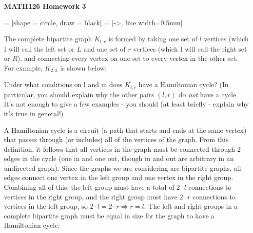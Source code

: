 \documentclass{article}
\begin{document}
\centerline{\large \bf MATH126 Homework 3}

\vskip 0.15in

 = [shape = circle, draw = black]
 = [->, line width=0.5mm]
\begin{problem} The complete bipartite graph $K_{l,r}$ is formed by taking one set of $l$ vertices (which I will call the left set or $L$ and one set of $r$ vertices (which I will call the right set or $R$), and connecting every vertex on one set to every vertex in the other set.  For example, $K_{2,3}$ is shown below:
\vskip 0.15in \noindent
{}
\vskip 0.15in \noindent
Under what conditions on l and m does $K_{l,r}$ have a Hamiltonian cycle? (In particular, you should explain why the other pairs $(l,r)$ do \emph{not} have a cycle. It's not enough to give a few examples - you should (at least briefly - explain why it's true in general!)
\end{problem}

\begin{solution} A Hamiltonian cycle is a circuit (a path that starts and ends at the same vertex) that passes through (or includes) all of the vertices of the graph.  From this definition, it follows that all vertices in the graph must be connected through 2 edges in the cycle (one in and one out, though in and out are arbitrary in an undirected graph).  Since the graphs we are considering are bipartite graphs, all edges connect one vertex in the left group and one vertex in the right group.  Combining all of this, the left group must have a total of $2\cdot l$ connections to vertices in the right group, and the right group must have $2\cdot r$ connections to vertices in the left group, so $2\cdot l = 2\cdot r \Rightarrow r=l$.  The left and right groups in a complete bipartite graph must be equal in size for the graph to have a Hamiltonian cycle.
\end{solution}
\end{document}
